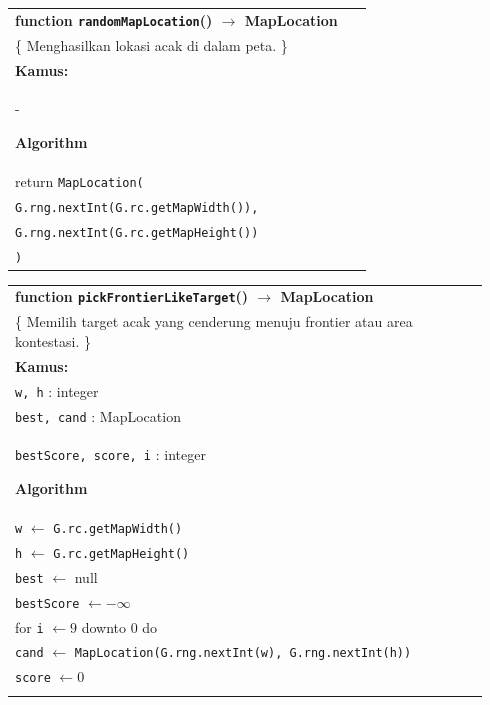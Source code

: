 \documentclass{article}
\newenvironment{pseudobox}
{
\centering
\begin{longtable}{|p{0.94\linewidth}|}
\hline
}
{
\\ \hline
\end{longtable}
\vspace{0.05cm}
}
\begin{document}
\begin{enumerate}[label=\alph*.]
\begin{enumerate}[label=\alph*.]
\begin{pseudobox}
\textbf{function \texttt{randomMapLocation}() $\rightarrow$ MapLocation} \\
\{ Menghasilkan lokasi acak di dalam peta. \} \\

\textbf{Kamus:} \\
\hspace*{1.5em}-

\textbf{Algorithm} \\
\hspace*{1.5em}return \texttt{MapLocation(} \\
\hspace*{3em}\texttt{G.rng.nextInt(G.rc.getMapWidth()),} \\
\hspace*{3em}\texttt{G.rng.nextInt(G.rc.getMapHeight())} \\
\hspace*{1.5em}\texttt{)}
\end{pseudobox}

\begin{pseudobox}
\textbf{function \texttt{pickFrontierLikeTarget}() $\rightarrow$ MapLocation} \\
\{ Memilih target acak yang cenderung menuju frontier atau area kontestasi. \} \\

\textbf{Kamus:} \\
\hspace*{1.5em}\texttt{w, h} : integer \\
\hspace*{1.5em}\texttt{best, cand} : MapLocation \\
\hspace*{1.5em}\texttt{bestScore, score, i} : integer

\textbf{Algorithm} \\
\hspace*{1.5em}\texttt{w} $\leftarrow$ \texttt{G.rc.getMapWidth()} \\
\hspace*{1.5em}\texttt{h} $\leftarrow$ \texttt{G.rc.getMapHeight()} \\
\hspace*{1.5em}\texttt{best} $\leftarrow$ null \\
\hspace*{1.5em}\texttt{bestScore} $\leftarrow -\infty$ \\

\hspace*{1.5em}for \texttt{i} $\leftarrow 9$ downto 0 do \\
\hspace*{3em}\texttt{cand} $\leftarrow$ \texttt{MapLocation(G.rng.nextInt(w), G.rng.nextInt(h))} \\
\hspace*{3em}\texttt{score} $\leftarrow 0$ \\


\end{pseudobox}
\end{enumerate}
\end{enumerate}
\end{document}
